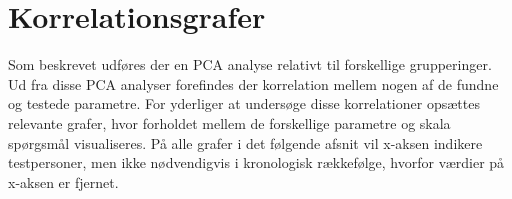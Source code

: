 \section{Korrelationsgrafer}
\label{DatabehandlingKorrelationsgrafer}
Som beskrevet udføres der en PCA analyse relativt til forskellige grupperinger. Ud fra disse PCA analyser forefindes der korrelation mellem nogen af de fundne og testede parametre. For yderliger at undersøge disse korrelationer opsættes relevante grafer, hvor forholdet mellem de forskellige parametre og skala spørgsmål visualiseres. På alle grafer i det følgende afsnit vil x-aksen indikere testpersoner, men ikke nødvendigvis i kronologisk rækkefølge, hvorfor værdier på x-aksen er fjernet.

